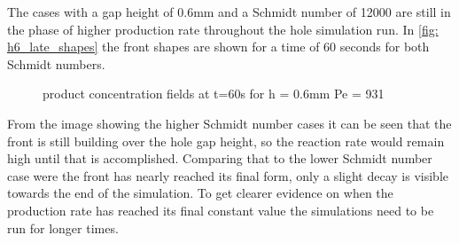 \documentclass[../thesis.tex]{subfiles}
\begin{document}
The cases with a gap height of 0.6mm and a Schmidt number of 12000 are still in the phase of higher production rate throughout the hole simulation run. In \autoref{fig: h6_late_shapes} the front shapes are shown for a time of 60 seconds for both Schmidt numbers.
\begin{figure}[htb]
	\centering
	\qquad
	\caption{product concentration fields at t=60s for  h = 0.6mm  Pe = 931}%
	\label{fig: h6_late_shapes}%
\end{figure}
From the image showing the higher Schmidt number cases it can be seen that the front is still building over the hole gap height, so the reaction rate would remain high until that is accomplished. Comparing that to the lower Schmidt number case were the front has nearly reached its final form, only a slight decay is visible towards the end of the simulation. To get clearer evidence on when the production rate has reached its final constant value the simulations need to be run for longer times.
\end{document}
